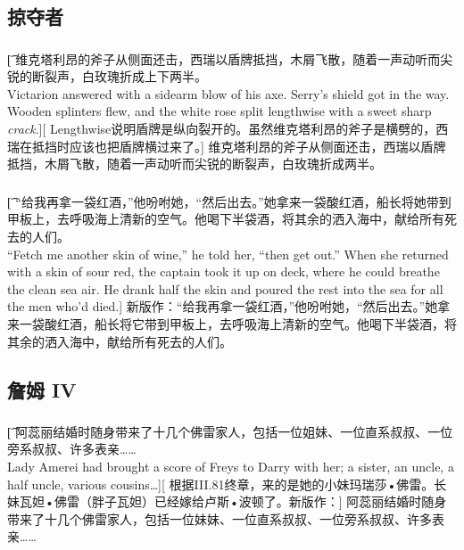 \documentclass[12pt,a4paper]{article}
\begin{document}
\subsection{掠夺者}
\subsubsection{}\t[
	维克塔利昂的斧子从侧面还击，西瑞以盾牌抵挡，木屑飞散，随着一声动听而尖锐的断裂声，白玫瑰折成上下两半。\\
	Victarion answered with a sidearm blow of his axe. Serry's shield got in the way. Wooden splinters flew, and the white rose split lengthwise with a sweet sharp \emph{crack}.][
	Lengthwise说明盾牌是纵向裂开的。虽然维克塔利昂的斧子是横劈的，西瑞在抵挡时应该也把盾牌横过来了。]
	维克塔利昂的斧子从侧面还击，西瑞以盾牌抵挡，木屑飞散，随着一声动听而尖锐的断裂声，白玫瑰折成两半。
	
\subsubsection{}\t[
	“给我再拿一袋红酒，”他吩咐她，“然后出去。”她拿来一袋酸红酒，船长将她带到甲板上，去呼吸海上清新的空气。他喝下半袋酒，将其余的洒入海中，献给所有死去的人们。\\
	“Fetch me another skin of wine,” he told her, “then get out.” When she returned with a skin of sour red, the captain took it up on deck, where he could breathe the clean sea air. He drank half the skin and poured the rest into the sea for all the men who'd died.]
	新版作：“给我再拿一袋红酒，”他吩咐她，“然后出去。”她拿来一袋酸红酒，船长将它带到甲板上，去呼吸海上清新的空气。他喝下半袋酒，将其余的洒入海中，献给所有死去的人们。
	

\subsection{詹姆 IV}
\subsubsection{}\t[
	阿蕊丽结婚时随身带来了十几个佛雷家人，包括一位姐妹、一位直系叔叔、一位旁系叔叔、许多表亲……\\
	Lady Amerei had brought a score of Freys to Darry with her; a sister, an uncle, a half uncle, various cousins\ldots ][
	根据III.81终章，来的是她的小妹玛瑞莎•佛雷。长妹瓦妲•佛雷（胖子瓦妲）已经嫁给卢斯•波顿了。新版作：]
	阿蕊丽结婚时随身带来了十几个佛雷家人，包括一位妹妹、一位直系叔叔、一位旁系叔叔、许多表亲……
	
\end{document}
